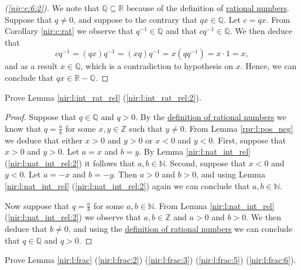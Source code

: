 \begin{proof}[(\ref{nir:e:6:2})]
	We note that $\mathbb{Q} \subseteq \mathbb{R}$ because of the definition of \hyperref[nir:d:rat_irrat]{rational numbers}. Suppose that $q \neq 0$, and suppose to the contrary that $q x \in \mathbb{Q}$. Let $c = q x$. From Corollary \ref{nir:c:rat} we observe that $q^{-1} \in \mathbb{Q}$ and that $c q^{-1} \in \mathbb{Q}$. We then deduce that
	$$
		c q^{-1} = (q x) q^{-1} = (x q) q^{-1} = x (q q^{-1}) = x \cdot 1 = x,
	$$
	and as a result $x \in \mathbb{Q}$, which is a contradiction to hypothesis on $x$. Hence, we can conclude that ${q x \in \mathbb{R} - \mathbb{Q}}$.
\end{proof}


\Newpage
\begin{exercise} %
	Prove Lemma \ref{nir:l:int_rat_rel} (\ref{nir:l:int_rat_rel:2}).
\end{exercise}

\begin{proof}
	Suppose that $q \in \mathbb{Q}$ and $q > 0$. By the \hyperref[nir:d:rat_irrat]{definition of rational numbers} we know that $q = \frac{a}{b}$ for some $x, y \in \mathbb{Z}$ such that $y \neq 0$. From Lemma \ref{rpr:l:pos_neg} we deduce that either $x > 0$ and $y > 0$ or $x < 0$ and $y < 0$. First, suppose that $x > 0$ and $y > 0$. Let $a = x$ and $b = y$. By Lemma \ref{nir:l:nat_int_rel} (\ref{nir:l:nat_int_rel:2}) it follows that $a, b \in \mathbb{N}$. Second, suppose that $x < 0$ and $y < 0$. Let $a = -x$ and $b = -y$. Then $a > 0$ and $b > 0$, and using Lemma \ref{nir:l:nat_int_rel} (\ref{nir:l:nat_int_rel:2}) again we can conclude that $a, b \in \mathbb{N}$.

	Now suppose that $q = \frac{a}{b}$ for some $a, b \in \mathbb{N}$. From Lemma \ref{nir:l:nat_int_rel} (\ref{nir:l:nat_int_rel:2}) we observe that $a, b \in \mathbb{Z}$ and $a > 0$ and $b > 0$. We then deduce that $b \neq 0$, and using the \hyperref[nir:d:rat_irrat]{definition of rational numbers} we can conclude that $q \in \mathbb{Q}$ and $q > 0$.
\end{proof}


\Newpage
\begin{exercise} %
	Prove Lemma \ref{nir:l:frac} (\ref{nir:l:frac:2}) (\ref{nir:l:frac:3}) (\ref{nir:l:frac:5}) (\ref{nir:l:frac:6}).
\end{exercise}

